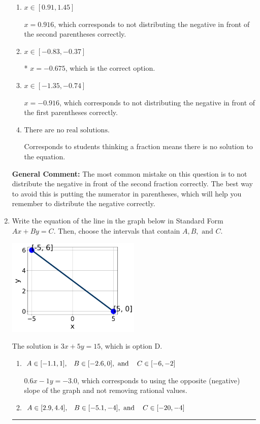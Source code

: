 \documentclass{extbook}[14pt]
\newcommand{\litem}[1]{\item #1

\rule{\textwidth}{0.4pt}}
\begin{document}
\begin{enumerate}
{\begin{enumerate}[label=\Alph*.]
$x = -3.864$, which corresponds to getting the negative of the actual solution.
\item \( x \in [0.91, 1.45] \)

$x = 0.916$, which corresponds to not distributing the negative in front of the second parentheses correctly.
\item \( x \in [-0.83, -0.37] \)

* $x = -0.675$, which is the correct option.
\item \( x \in [-1.35, -0.74] \)

$x = -0.916$, which corresponds to not distributing the negative in front of the first parentheses correctly.
\item \( \text{There are no real solutions.} \)

Corresponds to students thinking a fraction means there is no solution to the equation.
\end{enumerate}

\textbf{General Comment:} The most common mistake on this question is to not distribute the negative in front of the second fraction correctly. The best way to avoid this is putting the numerator in parentheses, which will help you remember to distribute the negative correctly.
}
\litem{
Write the equation of the line in the graph below in Standard Form $Ax+By=C$. Then, choose the intervals that contain $A, B, \text{ and } C$.

\begin{center}
    \includegraphics[width=0.5\textwidth]{../Figures/linearGraphToStandardC.png}
\end{center}


The solution is \( 3x + 5y = 15 \), which is option D.\begin{enumerate}[label=\Alph*.]
\item \( A \in [-1.1, 1], \hspace{3mm} B \in [-2.6, 0], \text{ and } \hspace{3mm} C \in [-6, -2] \)

 $0.6x - 1y = -3.0$, which corresponds to using the opposite (negative) slope of the graph and not removing rational values.
\item \( A \in [2.9, 4.4], \hspace{3mm} B \in [-5.1, -4], \text{ and } \hspace{3mm} C \in [-20, -4] \)


\end{enumerate}}
\end{enumerate}
\end{document}
